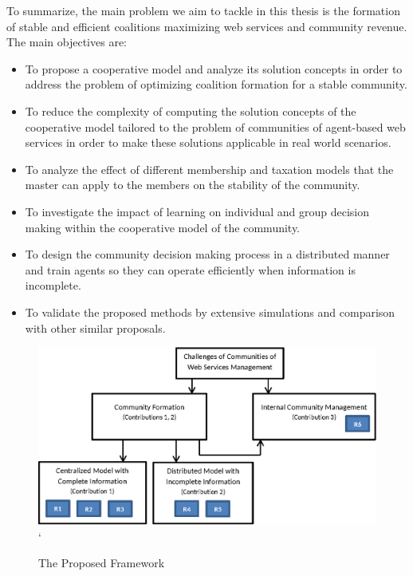 \indent To summarize, the main problem we aim to tackle in this thesis is the formation of stable and efficient coalitions maximizing web services and community revenue. The main objectives are:
\begin{itemize}
\item To propose a cooperative model and analyze its solution concepts in order to address the problem of optimizing coalition formation for a stable community.

\item To reduce the complexity of computing the solution concepts of the cooperative model tailored to the problem of communities of agent-based web services in order to make these solutions applicable in real world scenarios.

\item To analyze the effect of different membership and taxation models that the master can apply to the members on the stability of the community.

\item To investigate the impact of learning on individual and group decision making within the cooperative model of the community.

\item To design the community decision making process in a distributed manner and train agents so they can operate efficiently when information is incomplete.

\item To validate the proposed methods by extensive simulations and comparison with other similar proposals.
\end{itemize}


\begin{figure}[!t]
\centering
\includegraphics[width=6in]{Figures/model.eps}`
\caption{The Proposed Framework}
\label{fig_model}
\end{figure}

